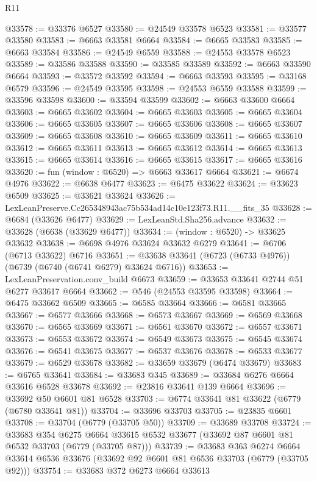 \begin{lexlean}{R11}
\begin{coremodule}
@33578 := @33376 @6527
@33580 := @24549 @33578 @6523
@33581 := @33577 @33580
@33583 := @6663 @33581 @6664
@33584 := @6665 @33583
@33585 := @6663 @33584
@33586 := @24549 @6559
@33588 := @24553 @33578 @6523
@33589 := @33586 @33588
@33590 := @33585 @33589
@33592 := @6663 @33590 @6664
@33593 := @33572 @33592
@33594 := @6663 @33593
@33595 := @33168 @6579
@33596 := @24549 @33595
@33598 := @24553 @6559 @33588
@33599 := @33596 @33598
@33600 := @33594 @33599
@33602 := @6663 @33600 @6664
@33603 := @6665 @33602
@33604 := @6665 @33603
@33605 := @6665 @33604
@33606 := @6665 @33605
@33607 := @6665 @33606
@33608 := @6665 @33607
@33609 := @6665 @33608
@33610 := @6665 @33609
@33611 := @6665 @33610
@33612 := @6665 @33611
@33613 := @6665 @33612
@33614 := @6665 @33613
@33615 := @6665 @33614
@33616 := @6665 @33615
@33617 := @6665 @33616
@33620 := fun (window : @6520) => @6663 @33617 @6664
@33621 := @6674 @4976
@33622 := @6638 @6477
@33623 := @6475 @33622
@33624 := @33623 @6509
@33625 := @33621 @33624
@33626 := LexLeanPreserve.Cc265348943ac75b534ad14c10e123f73.R11.__fits_35
@33628 := @6684 (@33626 @6477)
@33629 := LexLeanStd.Sha256.advance
@33632 := @33628 (@6638 (@33629 @6477))
@33634 := (window : @6520) -> @33625 @33632
@33638 := @6698 @4976 @33624 @33632 @6279
@33641 := @6706 (@6713 @33622) @6716
@33651 := @33638 @33641 (@6723 (@6733 @4976)) (@6739 (@6740 (@6741 @6279) @33624 @6716))
@33653 := LexLeanPreservation.conv_build @6673
@33659 := @33653 @33641 @2744 @51 @6277 @33617 @6664
@33662 := @546 (@24553 @33595 @33598)
@33664 := @6475 @33662 @6509
@33665 := @6585 @33664
@33666 := @6581 @33665
@33667 := @6577 @33666
@33668 := @6573 @33667
@33669 := @6569 @33668
@33670 := @6565 @33669
@33671 := @6561 @33670
@33672 := @6557 @33671
@33673 := @6553 @33672
@33674 := @6549 @33673
@33675 := @6545 @33674
@33676 := @6541 @33675
@33677 := @6537 @33676
@33678 := @6533 @33677
@33679 := @6529 @33678
@33682 := @33659 @33679 (@6474 @33679)
@33683 := @6765 @33641
@33684 := @33683 @345
@33689 := @33684 @6276 @6664 @33616 @6528 @33678
@33692 := @23816 @33641 @139 @6664
@33696 := @33692 @50 @6601 @81 @6528
@33703 := @6774 @33641 @81 @33622 (@6779 (@6780 @33641 @81))
@33704 := @33696 @33703
@33705 := @23835 @6601
@33708 := @33704 (@6779 (@33705 @50))
@33709 := @33689 @33708
@33724 := @33683
    @354
    @6275
    @6664
    @33615
    @6532
    @33677
    (@33692 @87 @6601 @81 @6532 @33703 (@6779 (@33705 @87)))
@33739 := @33683
    @363
    @6274
    @6664
    @33614
    @6536
    @33676
    (@33692 @92 @6601 @81 @6536 @33703 (@6779 (@33705 @92)))
@33754 := @33683
    @372
    @6273
    @6664
    @33613

\end{coremodule}
\end{lexlean}
